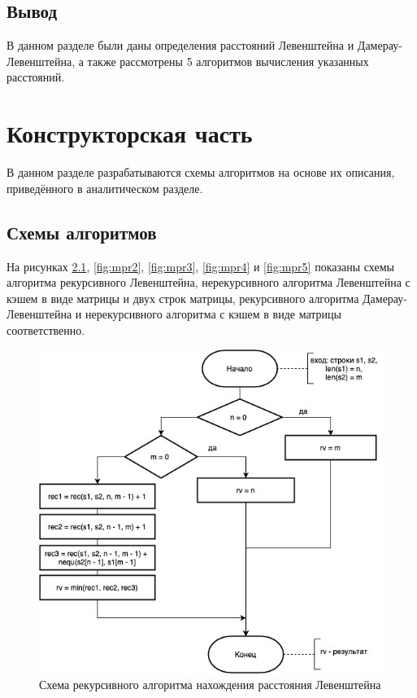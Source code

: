 \documentclass{report}
\begin{document}
\section{Вывод}

В данном разделе были даны определения расстояний Левенштейна и Дамерау-Левенштейна, а также рассмотрены 5 алгоритмов вычисления указанных расстояний.
	
\clearpage

\chapter{Конструкторская часть}
В данном разделе разрабатываются схемы алгоритмов на основе их описания, приведённого в аналитическом разделе.
\section{Схемы алгоритмов}\label{schemes}

На рисунках \ref{fig:mpr1}, \ref{fig:mpr2}, \ref{fig:mpr3}, \ref{fig:mpr4} и \ref{fig:mpr5} показаны схемы алгоритма рекурсивного Левенштейна, нерекурсивного алгоритма Левенштейна с кэшем в виде матрицы и двух строк матрицы, рекурсивного алгоритма Дамерау-Левенштейна и нерекурсивного алгоритма с кэшем в виде матрицы соответственно.
\begin{figure}[h!p]\label{recLev}
	\centering
	\includegraphics[scale = 0.7]{recLev.drawio.png}
	\caption{Схема рекурсивного алгоритма нахождения расстояния Левенштейна}
	\label{fig:mpr1}
\end{figure}
\end{document}
